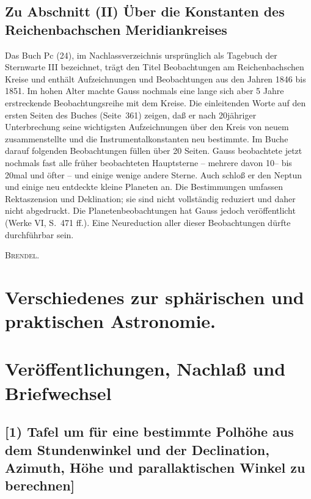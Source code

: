 \documentclass[12pt,a4paper]{article}
\theoremstyle{plain}
\theoremstyle{definition}
\theoremstyle{remark}
\begin{document}
\subsection*{Zu Abschnitt (II) \"Uber die Konstanten des Reichenbachschen Meridiankreises}

Das Buch Pc (24), im Nachlassverzeichnis urspr\"unglich als \glqq Tagebuch der Sternwarte III\grqq{} bezeichnet, tr\"agt den Titel \glqq Beobachtungen am Reichenbachschen Kreise\grqq{} und enth\"alt Aufzeichnungen und Beobachtungen aus den Jahren 1846 bis 1851. Im hohen Alter machte Gauss nochmals eine lange sich aber 5 Jahre erstreckende Beobachtungsreihe mit dem Kreise. Die einleitenden Worte auf den ersten Seiten des Buches (Seite~361) zeigen, da\ss{} er nach 20j\"ahriger Unterbrechung seine wichtigsten Aufzeichnungen \"uber den Kreis von neuem zusammenstellte und die Instrumentalkonstanten neu bestimmte. Im Buche darauf folgenden Beobachtungen f\"ullen \"uber 20 Seiten. Gauss beobachtete jetzt nochmals fast alle fr\"uher beobachteten Hauptsterne -- mehrere davon 10-- bis 20mal und \"ofter -- und einige wenige andere Sterne. Auch schlo\ss{} er den Neptun und einige neu entdeckte kleine Planeten an. Die Bestimmungen umfassen Rektaszension und Deklination; sie sind nicht vollst\"andig reduziert und daher nicht abgedruckt. Die Planetenbeobachtungen hat Gauss jedoch ver\"offentlicht (Werke VI, S.~471 ff.). Eine Neureduction aller dieser Beobachtungen d\"urfte durchf\"uhrbar sein.

\hfill\textsc{Brendel}.

\newpage

\section*{Verschiedenes zur sph\"arischen und praktischen Astronomie.}

\section*{Ver\"offentlichungen, Nachla\ss{} und Briefwechsel}

\subsection*{[1) Tafel um f\"ur eine bestimmte Polh\"ohe aus dem Stundenwinkel und der Declination, Azimuth, H\"ohe und parallaktischen Winkel zu berechnen]}
\end{document}
